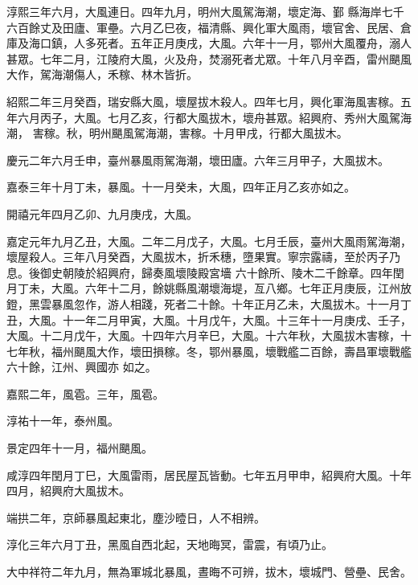 \begin{pinyinscope}
 淳熙三年六月，大風連日。四年九月，明州大風駕海潮，壞定海、鄞
 縣海岸七千六百餘丈及田廬、軍壘。六月乙巳夜，福清縣、興化軍大風雨，壞官舍、民居、倉庫及海口鎮，人多死者。五年正月庚戌，大風。六年十一月，鄂州大風覆舟，溺人甚眾。七年二月，江陵府大風，火及舟，焚溺死者尤眾。十年八月辛酉，雷州颶風大作，駕海潮傷人，禾稼、林木皆折。



 紹熙二年三月癸酉，瑞安縣大風，壞屋拔木殺人。四年七月，興化軍海風害稼。五年六月丙子，大風。七月乙亥，行都大風拔木，壞舟甚眾。紹興府、秀州大風駕海潮，
 害稼。秋，明州颶風駕海潮，害稼。十月甲戌，行都大風拔木。



 慶元二年六月壬申，臺州暴風雨駕海潮，壞田廬。六年三月甲子，大風拔木。



 嘉泰三年十月丁未，暴風。十一月癸未，大風，四年正月乙亥亦如之。



 開禧元年四月乙卯、九月庚戌，大風。



 嘉定元年九月乙丑，大風。二年二月戊子，大風。七月壬辰，臺州大風雨駕海潮，壞屋殺人。三年八月癸酉，大風拔木，折禾穗，墮果實。寧宗露禱，至於丙子乃息。後御史朝陵於紹興府，歸奏風壞陵殿宮墻
 六十餘所、陵木二千餘章。四年閏月丁未，大風。六年十二月，餘姚縣風潮壞海堤，亙八鄉。七年正月庚辰，江州放鐙，黑雲暴風忽作，游人相踐，死者二十餘。十年正月乙未，大風拔木。十一月丁丑，大風。十一年二月甲寅，大風。十月戊午，大風。十三年十一月庚戌、壬子，大風。十二月戊午，大風。十四年六月辛巳，大風。十六年秋，大風拔木害稼，十七年秋，福州颶風大作，壞田損稼。冬，鄂州暴風，壞戰艦二百餘，壽昌軍壞戰艦六十餘，江州、興國亦
 如之。



 嘉熙二年，風雹。三年，風雹。



 淳祐十一年，泰州風。



 景定四年十一月，福州颶風。



 咸淳四年閏月丁巳，大風雷雨，居民屋瓦皆動。七年五月甲申，紹興府大風。十年四月，紹興府大風拔木。



 端拱二年，京師暴風起東北，塵沙曀日，人不相辨。



 淳化三年六月丁丑，黑風自西北起，天地晦冥，雷震，有頃乃止。



 大中祥符二年九月，無為軍城北暴風，晝晦不可辨，拔木，壞城門、營壘、民舍。




\end{pinyinscope}
